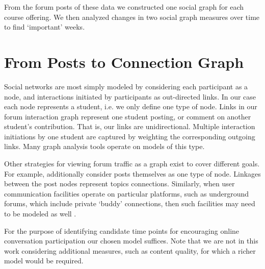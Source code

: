 From the forum posts of these data we constructed one social graph for
each course offering. We then analyzed changes in two social graph
measures over time to find `important' weeks.

\section{From Posts to Connection Graph}

Social networks are most simply modeled by considering each
participant as a node, and interactions initiated by participants as
out-directed links. In our case each node represents a student,
i.e. we only define one type of node. Links in our forum interaction
graph represent one student posting, or comment on another student's
contribution. That is, our links are unidirectional. Multiple
interaction initiations by one student are captured by weighting the
corresponding outgoing links. Many graph analysis tools operate on
models of this type.

Other strategies for viewing forum traffic as a graph exist to cover
different goals. For example, \cite{Anwar2013} additionally consider
posts themselves as one type of node. Linkages between the post nodes
represent topics connections. Similarly, when user communication
facilities operate on particular platforms, such as underground
forums, which include private `buddy' connections, then such
facilities may need to be modeled as well \cite{Moto2011}.

For the purpose of identifying candidate time points for encouraging
online conversation participation our chosen model suffices. Note that
we are not in this work considering additional measures, such as
content quality, for which a richer model would be required.

